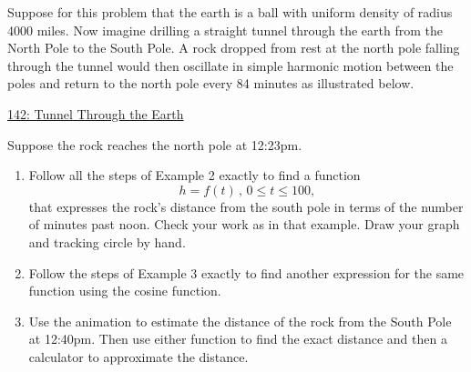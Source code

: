 \documentclass{ximera}
\begin{document}
\begin{exercise} \label{Exdfe}
Suppose for this problem that the earth is a ball with uniform density of radius 4000 miles. Now imagine drilling a straight tunnel through the earth from the North Pole to the South Pole. A rock dropped from rest at the north pole falling through the tunnel would then oscillate in simple harmonic motion between the poles and return to the north pole every 84  minutes as illustrated below. %

\begin{onlineOnly}
    \begin{center}
\end{center}
\end{onlineOnly}

\href{https://www.desmos.com/calculator/z5ya8iy2e4}{142: Tunnel Through the Earth }

Suppose the rock reaches the north pole at 12:23pm.

\begin{enumerate}

\item  Follow all the steps of Example 2 exactly to find a function
\[
  h = f(t) \, , \, 0\leq t \leq 100,
\]
that expresses the rock's distance from the south pole in terms of the number of minutes past noon. Check your work as in that example. Draw your graph and tracking circle by hand.

\item Follow the steps of Example 3 exactly to find another expression for the same function using the cosine function.

\item Use the animation to estimate the distance of the rock from the South Pole at 12:40pm. Then use either function to find the exact distance and then a calculator to approximate the distance.
\end{enumerate}

\end{exercise}
\end{document}
